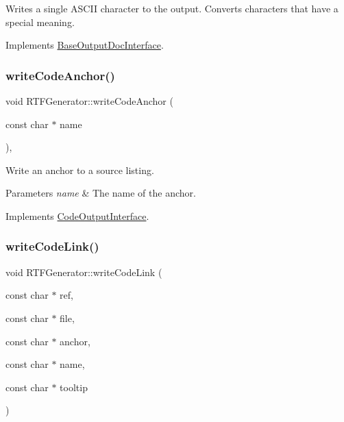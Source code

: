Writes a single A\+S\+C\+II character to the output. Converts characters that have a special meaning. 

Implements \mbox{\hyperlink{class_base_output_doc_interface_a1577324720c1c71142dff84ae80b058d}{Base\+Output\+Doc\+Interface}}.

\mbox{\label{class_r_t_f_generator_a01b1cb771ecbdb9da62b21c980d1a5ae}} 
\subsubsection{\texorpdfstring{writeCodeAnchor()}{writeCodeAnchor()}}
{\footnotesize\ttfamily void R\+T\+F\+Generator\+::write\+Code\+Anchor (\begin{DoxyParamCaption}\item[{const char $\ast$}]{name }\end{DoxyParamCaption})\hspace{0.3cm}{\ttfamily [inline]}, {\ttfamily [virtual]}}

Write an anchor to a source listing. 
\begin{DoxyParams}{Parameters}
{\em name} & The name of the anchor. \\
\hline
\end{DoxyParams}


Implements \mbox{\hyperlink{class_code_output_interface_a1f6394c4ef7c4143de90bcaf3a65c0b4}{Code\+Output\+Interface}}.

\mbox{\label{class_r_t_f_generator_ad598f8811fde4d3b1849c2e9b92a6686}} 
\subsubsection{\texorpdfstring{writeCodeLink()}{writeCodeLink()}}
{\footnotesize\ttfamily void R\+T\+F\+Generator\+::write\+Code\+Link (\begin{DoxyParamCaption}\item[{const char $\ast$}]{ref,  }\item[{const char $\ast$}]{file,  }\item[{const char $\ast$}]{anchor,  }\item[{const char $\ast$}]{name,  }\item[{const char $\ast$}]{tooltip }\end{DoxyParamCaption})\hspace{0.3cm}{\ttfamily [virtual]}}

